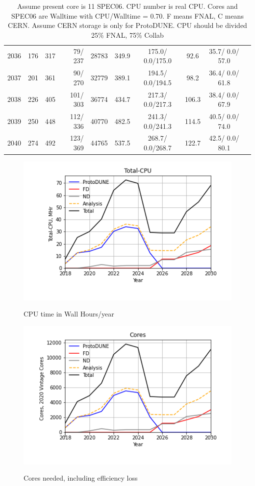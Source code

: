 \documentclass[12pt]{article}
\begin{document}
\begin{table}
\begin{tabular}[h]{crrrrrcccc}
2036&	 176&	 317&	  79/ 237&	 28783&	    349.9&	 175.0/  0.0/175.0&	     92.6&	  35.7/  0.0/ 57.0\\
2037&	 201&	 361&	  90/ 270&	 32779&	    389.1&	 194.5/  0.0/194.5&	     98.2&	  36.4/  0.0/ 61.8\\
2038&	 226&	 405&	 101/ 303&	 36774&	    434.7&	 217.3/  0.0/217.3&	    106.3&	  38.4/  0.0/ 67.9\\
2039&	 250&	 448&	 112/ 336&	 40770&	    482.5&	 241.3/  0.0/241.3&	    114.5&	  40.5/  0.0/ 74.0\\
2040&	 274&	 492&	 123/ 369&	 44765&	    537.5&	 268.7/  0.0/268.7&	    122.7&	  42.5/  0.0/ 80.1\\
\end{tabular}
\caption{Assume present core is   11 SPEC06. CPU number is real CPU. Cores and SPEC06 are Walltime with CPU/Walltime =  0.70.  F means FNAL, C means CERN. Assume CERN storage is only  for ProtoDUNE. CPU should be divided 25\% FNAL, 75\% Collab}\normalsize
 \end{table}
\pagebreak\begin{figure}
\centering\includegraphics[height=0.4\textwidth]{Total-CPU.png}\label{TotalCPU}
\caption{CPU time in Wall Hours/year}
\end{figure}
\begin{figure}
\centering\includegraphics[height=0.4\textwidth]{Cores.png}\label{Cores}
\caption{Cores needed, including efficiency loss}
\end{figure}
\end{document}
